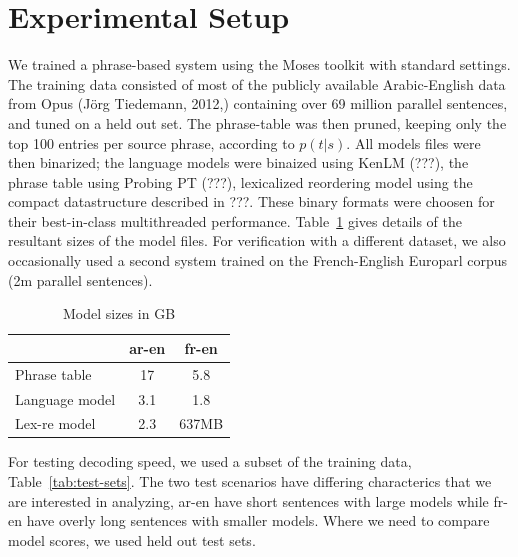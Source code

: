\documentclass[11pt]{article}
\begin{document}
\section{Experimental Setup}

We trained a phrase-based system using the Moses toolkit with standard settings. The training data consisted of most of the publicly available Arabic-English data from Opus (Jörg Tiedemann, 2012,) containing over 69 million parallel sentences, and tuned on a held out set. The phrase-table was then pruned, keeping only the top 100 entries per source phrase, according to $p(t|s)$. All models files were then binarized; the language models were binaized using KenLM (???), the phrase table using Probing PT (???), lexicalized reordering model using the compact datastructure described in ???. These binary formats were choosen for their best-in-class multithreaded performance. Table~\ref{tab:model-files} gives details of the resultant sizes of the model files. For verification with a different dataset, we also occasionally used a second system trained on the French-English Europarl corpus (2m parallel sentences). 
\begin{table}[h]
\begin{center}
\begin{tabular}{|l|c|c|} \hline
		& ar-en	& fr-en \\ \hline
Phrase table  	& 17 	& 5.8 \\
Language model 	& 3.1  	& 1.8 \\ 
Lex-re model	& 2.3	& 637MB \\ \hline
\end{tabular}
\end{center}
\caption{Model sizes in GB}
\label{tab:model-files}
\end{table}
For testing decoding speed, we used a subset of the training data, Table~\ref{tab:test-sets}. The two test scenarios have differing characterics that we are interested in analyzing, ar-en have short sentences with large models while fr-en have overly long sentences with smaller models. Where we need to compare model scores, we used held out test sets.
\end{document}
